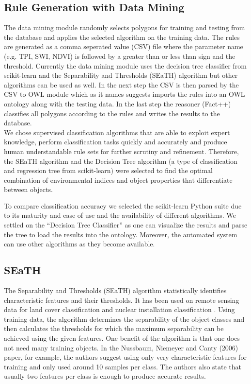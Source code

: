 \documentclass[authoryear, review,12pt,number]{elsarticle}
\begin{document}
\subsection{Rule Generation with Data Mining}
The data mining module randomly selects polygons for training and testing from
the database and applies the selected
algorithm on the training data. The rules are generated as a comma seperated
value (CSV) file where the parameter name (e.g. TPI, SWI, NDVI) is followed by a
greater than or less than sign and the threshold. Currently the data mining
module uses the decision tree classifier from scikit-learn \citep{scikit-learn}
and the Separability and Thresholds (SEaTH) algorithm \citep{Nussbaum2006} but
other algorithms can be used as well. In the next step the CSV is then parsed
by the CSV to OWL module which as it names suggests imports the rules into an
OWL ontology along with the testing data. In the last step the reasoner (Fact++)
classifies all polygons according to the rules and writes the results to the database.\\
We chose supervised classification algorithms that are able to exploit expert
knowledge, perform classification tasks quickly and accurately and produce
human understandable rule sets for further scrutiny and refinement. Therefore,
the SEaTH algorithm and the Decision Tree algorithm (a type of classification
and regression tree from scikit-learn) were selected to find the optimal
combination of environmental indices and object properties that differentiate
between objects. 

To compare classification accuracy we selected the scikit-learn Python suite
\citep{scikit-learn} due to its maturity and ease of use and the availability of
different algorithms. We settled on the ``Decision Tree Classifier'' as one can
visualize the results and parse the tree to load the results into the ontology.
Moreover, the automated system can use other algorithms as they become available.
\subsection{SEaTH}
The Separability and Thresholds (SEaTH) algorithm
\citep{Nussbaum2006} statistically identifies characteristic features and their
thresholds. It has been used on remote sensing data for land cover
classification \citep{Gao2011} and nuclear installation classification
\citep{Nussbaum2006}. Using training data, the algorithm determines the
separability of the object classes and then calculates the thresholds for which
the maximum separability can be achieved using the given features. One benefit
of the algorithm is that one does not need many training objects.
In the Nussbaum, Niemeyer and Canty (2006) paper, for example, the authors
suggest using only very characteristic features for training and only used
around 10 samples per class\citep{Nussbaum2006}. The authors also state that
usually two features per class is enough to produce accurate results.
\end{document}
